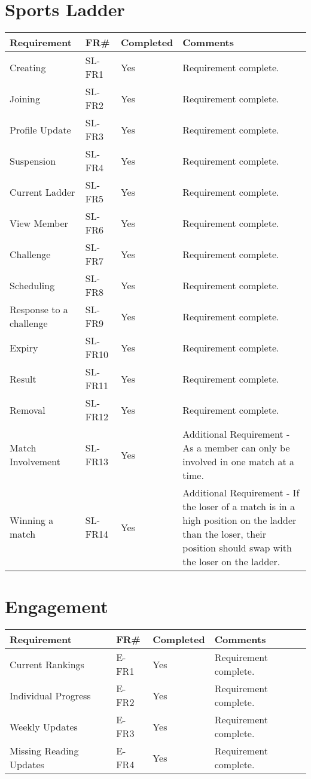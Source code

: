 \section{Sports Ladder}
\begin{tabular}{ |p{5cm}|l|l|p{8cm}|}
\hline
\textbf{Requirement}	&	\textbf{FR\#}	&	\textbf{Completed}	&	\textbf{Comments} \\
\hline
Creating 											& SL-FR1	& Yes 		& Requirement complete. \\
\hline
Joining 											& SL-FR2	& Yes 		& Requirement complete. \\
\hline
Profile Update 										& SL-FR3	& Yes		& Requirement complete. \\
\hline
Suspension 											& SL-FR4	& Yes 		& Requirement complete. \\
\hline
Current Ladder	 									& SL-FR5	& Yes 		& Requirement complete. \\
\hline
View Member											& SL-FR6	& Yes 		& Requirement complete. \\
\hline
Challenge 											& SL-FR7	& Yes		& Requirement complete. \\
\hline
Scheduling 											& SL-FR8	& Yes 		& Requirement complete. \\
\hline
Response to a challenge 							& SL-FR9 	& Yes 		& Requirement complete. \\
\hline
Expiry 												& SL-FR10 	& Yes		& Requirement complete. \\
\hline
Result 												& SL-FR11 	& Yes 		& Requirement complete. \\
\hline
Removal 											& SL-FR12 	& Yes 		& Requirement complete. \\
\hline
Match Involvement									& SL-FR13 	& Yes 		& Additional Requirement - As a member can only be involved in one match at a time. \\
\hline
Winning a match 									& SL-FR14 	& Yes 		& Additional Requirement - If the loser of a match is in a high position on the ladder than the loser, their position should swap with the loser on the ladder. \\

\hline
\end{tabular}

\section{Engagement}
\begin{tabular}{ |p{5cm}|l|l|p{8cm}|}
\hline
\textbf{Requirement}	&	\textbf{FR\#}	&	\textbf{Completed}	&	\textbf{Comments} \\
\hline
Current Rankings 									& E-FR1		& Yes	& Requirement complete. \\
\hline
Individual Progress									& E-FR2		& Yes	& Requirement complete. \\
\hline
Weekly Updates 										& E-FR3		& Yes	& Requirement complete. \\
\hline
Missing Reading Updates 							& E-FR4		& Yes	& Requirement complete. \\

\hline
\end{tabular}


